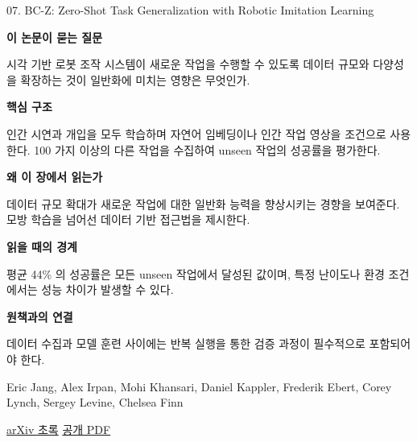 \documentclass[11pt,openany]{book}
\begin{document}
\begin{termcard}{07. BC-Z: Zero-Shot Task Generalization with Robotic Imitation Learning}

\par

\medskip

{\sffamily\bfseries\color{deepblue} 이 논문이 묻는 질문}\par

시각 기반 로봇 조작 시스템이 새로운 작업을 수행할 수 있도록 데이터 규모와 다양성을 확장하는 것이 일반화에 미치는 영향은 무엇인가.

\smallskip

{\sffamily\bfseries\color{deepblue} 핵심 구조}\par

인간 시연과 개입을 모두 학습하며 자연어 임베딩이나 인간 작업 영상을 조건으로 사용한다. 100 가지 이상의 다른 작업을 수집하여 unseen 작업의 성공률을 평가한다.

\smallskip

{\sffamily\bfseries\color{deepblue} 왜 이 장에서 읽는가}\par

데이터 규모 확대가 새로운 작업에 대한 일반화 능력을 향상시키는 경향을 보여준다. 모방 학습을 넘어선 데이터 기반 접근법을 제시한다.

\smallskip

{\sffamily\bfseries\color{coral} 읽을 때의 경계}\par

평균 44\% 의 성공률은 모든 unseen 작업에서 달성된 값이며, 특정 난이도나 환경 조건에서는 성능 차이가 발생할 수 있다.

\smallskip

{\sffamily\bfseries\color{teal} 원책과의 연결}\par

데이터 수집과 모델 훈련 사이에는 반복 실행을 통한 검증 과정이 필수적으로 포함되어야 한다.

\medskip

{\footnotesize\color{muted} Eric Jang, Alex Irpan, Mohi Khansari, Daniel Kappler, Frederik Ebert, Corey Lynch, Sergey Levine, Chelsea Finn\par

\href{https://arxiv.org/abs/2202.02005}{arXiv 초록} \quad \href{https://arxiv.org/pdf/2202.02005}{공개 PDF}\par}

\end{termcard}
\end{document}
